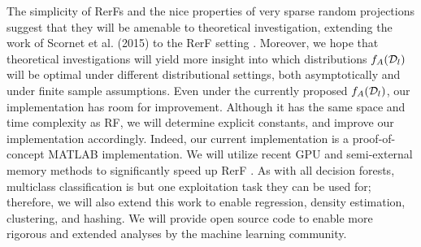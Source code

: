\documentclass{article}
\begin{document}
The simplicity of RerFs and the nice properties of very sparse random projections \cite{Li2006} suggest that they will be amenable to theoretical investigation, extending the work of Scornet et al. (2015) to the RerF setting \cite{Scornet2015}. Moreover, we hope that theoretical investigations will yield more insight into which distributions $f_A(\mathcal{D}_l)$ will be optimal under different distributional settings, both asymptotically and under finite sample assumptions. Even under the currently proposed $f_A(\mathcal{D}_l)$, our implementation has room for improvement. Although it has the same space and time complexity as RF, we will determine explicit constants, and improve our implementation accordingly. Indeed, our current implementation is a proof-of-concept MATLAB implementation. We will utilize recent GPU and semi-external memory methods to significantly speed up RerF \cite{zheng15flashgraph}. As with all decision forests, multiclass classification is but one exploitation task they can be used for; therefore, we will also extend this work to enable regression, density estimation, clustering, and hashing. We will provide open source code to enable more rigorous and extended analyses by the machine learning community.



\end{document}
